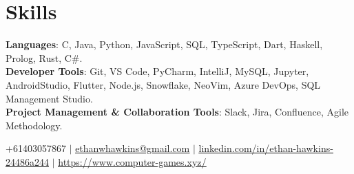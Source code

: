 \documentclass[letterpaper,11pt]{article}
\begin{document}
\section{Skills}
 \begin{itemize}[leftmargin=0.15in, label={}]
    \small{\item{
    \vspace{1mm}
     \textbf{Languages}{: C, Java, Python, JavaScript, SQL, TypeScript, Dart, Haskell, Prolog, Rust, C\#.} \\
     \vspace{1mm}
     \textbf{Developer Tools}{: Git, VS Code, PyCharm, IntelliJ, MySQL, Jupyter, AndroidStudio, Flutter, Node.js, Snowflake, NeoVim, Azure DevOps, SQL Management Studio.} \\
     \textbf{Project Management \& Collaboration Tools}{: Slack, Jira, Confluence, Agile Methodology.} \\
     \vspace{1mm}

    }}
 \end{itemize}
 \begin{center}
    
\small +61403057867 $|$ 
\href{mailto:ADD EMAIL HERE@x.com}{\underline{ethanwhawkins@gmail.com}} $|$
\href{ADD LINKEDIN PAGE HERE}{\underline{linkedin.com/in/ethan-hawkins-24486a244}} 
$|$
\href{ADD LINKEDIN PAGE HERE}{\underline{https://www.computer-games.xyz/}} 

\end{center}
\end{document}
